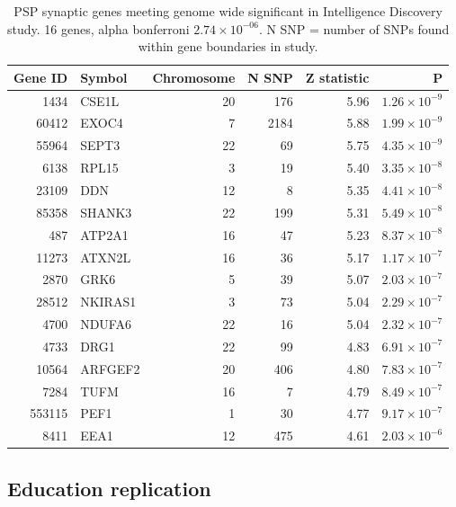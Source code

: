 \begin{table}[ht]
\centering
\begin{tabular}{rlrrrr}
  \hline
 Gene ID & Symbol & Chromosome & N SNP & Z statistic & P \\ 
  \hline
1434 & CSE1L &  20 & 176 & 5.96 & $1.26 \times 10^{-9}$ \\ 
  60412 & EXOC4 &   7 & 2184 & 5.88 & $1.99 \times 10^{-9}$ \\ 
  55964 & SEPT3 &  22 &  69 & 5.75 & $4.35 \times 10^{-9}$ \\ 
  6138 & RPL15 &   3 &  19 & 5.40 & $3.35 \times 10^{-8}$ \\ 
  23109 & DDN &  12 &   8 & 5.35 & $4.41 \times 10^{-8}$ \\ 
  85358 & SHANK3 &  22 & 199 & 5.31 & $5.49 \times 10^{-8}$ \\ 
  487 & ATP2A1 &  16 &  47 & 5.23 & $8.37 \times 10^{-8}$ \\ 
  11273 & ATXN2L &  16 &  36 & 5.17 & $1.17 \times 10^{-7}$ \\ 
  2870 & GRK6 &   5 &  39 & 5.07 & $2.03 \times 10^{-7}$ \\ 
  28512 & NKIRAS1 &   3 &  73 & 5.04 & $2.29 \times 10^{-7}$ \\ 
  4700 & NDUFA6 &  22 &  16 & 5.04 & $2.32 \times 10^{-7}$ \\ 
  4733 & DRG1 &  22 &  99 & 4.83 & $6.91 \times 10^{-7}$ \\ 
  10564 & ARFGEF2 &  20 & 406 & 4.80 & $7.83 \times 10^{-7}$ \\ 
  7284 & TUFM &  16 &   7 & 4.79 & $8.49 \times 10^{-7}$ \\ 
  553115 & PEF1 &   1 &  30 & 4.77 & $9.17 \times 10^{-7}$ \\ 
  8411 & EEA1 &  12 & 475 & 4.61 & $2.03 \times 10^{-6}$ \\ 
   \hline
\end{tabular}
\caption{PSP synaptic genes meeting genome wide significant in Intelligence Discovery study. 16 genes, alpha bonferroni $2.74 \times 10^{-06}$. N SNP = number of SNPs found within gene boundaries in study.  } 
\label{tab:Significant synaptic genes in ctg MAGMA GWAS2}
\end{table}

\subsection{Education replication}

